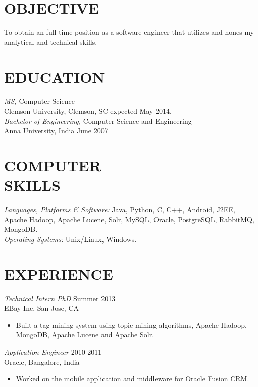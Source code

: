 \documentclass[line,margin]{res}
\begin{document}
\address{813 College Ave, Apt 23, Clemson, SC 29631}
\address{gyanasr@g.clemson.edu $\mid$ gyan404.com $\mid$ (864) 633-9988}

 
\begin{resume}
 
\section{OBJECTIVE}       To obtain an full-time position as a software engineer that utilizes and hones my analytical and technical skills. 
 
\section{EDUCATION} 
{\sl MS,} Computer Science \\
                Clemson University, Clemson, SC 
                expected May 2014.\\
				{\sl Bachelor of Engineering,} Computer Science and Engineering \\
                Anna University, India 
                June 2007 \\
 
 
\section{COMPUTER \\ SKILLS} {\sl Languages, Platforms \& Software:} Java, Python, C, C++, Android, J2EE, Apache Hadoop, Apache Lucene, Solr, MySQL, Oracle, PostgreSQL, RabbitMQ, MongoDB. \\
                {\sl Operating Systems:}  Unix/Linux, Windows.
 
\section{EXPERIENCE} 
{\sl Technical Intern PhD} \hfill Summer 2013\\
                EBay Inc, San Jose, CA
                 \begin{itemize}  \itemsep -2pt %
                 \item Built a tag mining system using topic mining algorithms, Apache Hadoop, MongoDB, Apache Lucene and Apache Solr.
                \end{itemize}
{\sl Application Engineer} \hfill 2010-2011 \\
               Oracle, 
                Bangalore, India
                 \begin{itemize}  \itemsep -2pt %
                 \item Worked on the mobile application and middleware for
Oracle Fusion CRM. 
                \end{itemize}
 

\end{resume}
\end{document}
